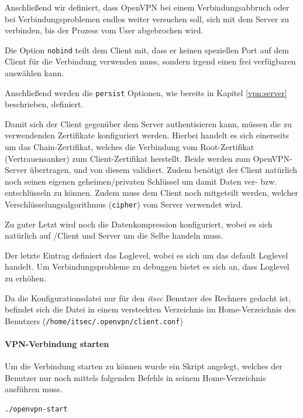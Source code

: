 Anschließend wir definiert, dass OpenVPN bei einem Verbindungsabbruch oder bei Verbindungsproblemen endlos weiter versuchen soll, sich mit dem Server zu verbinden, bis der Prozess vom User abgebrochen wird.

Die Option \texttt{nobind} teilt dem Client mit, dass er keinen speziellen Port auf dem Client für die Verbindung verwenden muss, sondern irgend einen frei verfügbaren auswählen kann.

Anschließend werden die \texttt{persist} Optionen, wie bereits in Kapitel \ref{vpn:server} beschrieben, definiert.

Damit sich der Client gegenüber dem Server authentisieren kann, müssen die zu verwendenden Zertifikate konfiguriert werden. Hierbei handelt es sich einerseits um das Chain-Zertifikat, welches die Verbindung vom Root-Zertifikat (Vertrauensanker) zum Client-Zertifikat herstellt. Beide werden zum OpenVPN-Server übertragen, und von diesem validiert. Zudem benötigt der Client natürlich noch seinen eigenen geheimen/privaten Schlüssel um damit Daten ver- bzw. entschlüsseln zu können. Zudem muss dem Client noch mitgeteilt werden, welcher Verschlüsselungsalgorithmus (\texttt{cipher}) vom Server verwendet wird.

Zu guter Letzt wird noch die Datenkompression konfiguriert, wobei es sich natürlich auf /Client und Server um die Selbe handeln muss.

Der letzte Eintrag definiert das Loglevel, wobei es sich um das default Loglevel handelt. Um Verbindungsprobleme zu debuggen bietet es sich an, dass Loglevel zu erhöhen.

Da die Konfigurationsdatei nur für den \emph{itsec} Benutzer des Rechners gedacht ist, befindet sich die Datei in einem versteckten Verzeichnis im Home-Verzeichnis des Benutzers (\texttt{/home/itsec/.openvpn/client.conf})

\paragraph{VPN-Verbindung starten}

Um die Verbindung starten zu können wurde ein Skript angelegt, welches der Benutzer nur noch mittels folgenden Befehls in seinem Home-Verzeichnis ausführen muss.

\begin{lstlisting}
./openvpn-start
\end{lstlisting}




